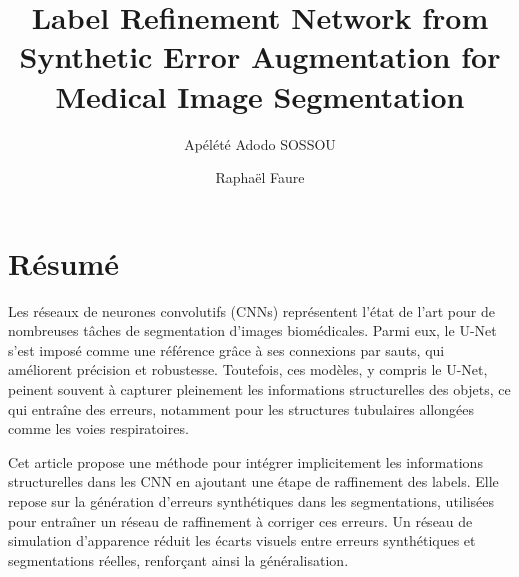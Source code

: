 \documentclass[a4paper,12pt]{article}
\title{Label Refinement Network from Synthetic Error Augmentation for Medical Image Segmentation }
\author{Apélété Adodo SOSSOU}
\author{Raphaël Faure}
\affil{Ecole Normale Supérieure de Paris-Saclay}
\date{}
\begin{document}
\maketitle

\section*{Résumé}

Les réseaux de neurones convolutifs (CNNs) représentent l’état de l’art pour de nombreuses
tâches de segmentation d’images biomédicales. Parmi eux, le U-Net s’est imposé comme une
référence grâce à ses connexions par sauts, qui améliorent précision et robustesse. Toutefois, ces
modèles, y compris le U-Net, peinent souvent à capturer pleinement les informations structurelles
des objets, ce qui entraîne des erreurs, notamment pour les structures tubulaires allongées comme
les voies respiratoires.

Cet article propose une méthode pour intégrer implicitement les informations structurelles
dans les CNN en ajoutant une étape de raffinement des labels. Elle repose sur la génération
d’erreurs synthétiques dans les segmentations, utilisées pour entraîner un réseau de raffinement
à corriger ces erreurs. Un réseau de simulation d’apparence réduit les écarts visuels entre erreurs
synthétiques et segmentations réelles, renforçant ainsi la généralisation.
\end{document}
